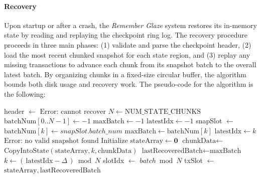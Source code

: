 \documentclass[conference]{IEEEtran}
\begin{document}
\paragraph{Recovery }
Upon startup or after a crash, the \textit{Remember Glaze} system restores its in-memory state by reading and replaying the checkpoint ring log. The recovery procedure proceeds in three main phases: (1) validate and parse the checkpoint header, (2) load the most recent chunked snapshot for each state region, and (3) replay any missing transactions to advance each chunk from its snapshot batch to the overall latest batch. By organizing chunks in a fixed-size circular buffer, the algorithm bounds both disk usage and recovery work. The pseudo-code for the algorithm is the following: 
\begin{algorithm}[H]
\scriptsize
\caption{Recovery Algorithm (Pseudocode)}
\begin{algorithmic}[1]
    \State header \(\leftarrow\) 
        \State \Return \(\text{Error: cannot recover}\)
    \EndIf
    \State \(N \leftarrow \text{NUM\_STATE\_CHUNKS}\)
    \State \(\text{batchNum}[0..N-1] \leftarrow -1\)
    \State \(\text{maxBatch} \leftarrow -1\)
    \State \(\text{latestIdx} \leftarrow -1\)
        \State snapSlot \(\leftarrow\) 
            \State \(\text{batchNum}[k] \leftarrow snapSlot.batch\_num\)
                \State \(\text{maxBatch} \leftarrow \text{batchNum}[k]\)
                \State \(\text{latestIdx} \leftarrow k\)
            \EndIf
        \EndIf
    \EndFor
        \State \Return \(\text{Error: no valid snapshot found}\)
    \EndIf
    \State Initialize \(\text{stateArray} \leftarrow \mathbf{0}\)
            \State \(\text{chunkData} \leftarrow\) 
            \State \(\text{CopyIntoState}(\text{stateArray}, k, \text{chunkData})\)
        \EndIf
    \EndFor
    \State \(\text{lastRecoveredBatch} \leftarrow \text{maxBatch}\)
        \State \(k \leftarrow (\,\text{latestIdx} - \Delta\,) \bmod N\)
            \State slotIdx \(\leftarrow\) \(batch \bmod N\)
            \State txSlot \(\leftarrow\) 
                    \State {}
                \EndIf
            \EndFor
        \EndFor
    \EndFor
    \State \Return \(\text{stateArray},\,\text{lastRecoveredBatch}\)
\EndFunction
\end{algorithmic}
\end{algorithm}
\end{document}
